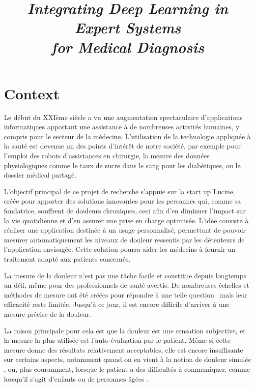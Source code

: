 \documentclass[french]{article}
\date{}
\title{\emph{Integrating Deep Learning in Expert Systems\\ for Medical Diagnosis}}
\begin{document}
\maketitle

\section{Context}
\label{sec:orga8bb14f}

Le début  du XXIème  siècle a vu  une augmentation  spectaculaire d’applications
informatiques apportant  une assistance  à de  nombreuses activités  humaines, y
compris  pour  le  secteur  de  la médecine.  L’utilisation  de  la  technologie
appliquée à la santé  est devenue un des points d’intérêt  de notre société, par
exemple  pour l’emploi  des robots  d’assistances  en chirurgie,  la mesure  des
données physiologiques comme le taux de sucre dans le sang pour les diabétiques,
ou le dossier médical partagé.

L’objectif principal de ce projet de  recherche s’appuie sur la start up Lucine,
créée pour  apporter des solutions innovantes  pour les personnes qui,  comme sa
fondatrice, souffrent de  douleurs chroniques, ceci afin  d’en diminuer l’impact
sur la  vie quotidienne et d’en  assurer une prise en  charge optimisée.  L’idée
consiste à réaliser une application destinée à un usage personnalisé, permettant
de  pouvoir mesurer  automatiquement les  niveaux de  douleur ressentis  par les
détenteurs de l’application envisagée. Cette  solution pourra aider les médecins
à fournir un traitement adapté aux patients concernés.

La mesure de la douleur n’est pas une tâche facile et constitue depuis longtemps
un défi, même pour des professionnels  de santé avertis.  De nombreuses échelles
et   méthodes  de   mesure   ont  été   créées  pour   répondre   à  une   telle
question~\cite{wong1996wong,mccaffery1999pain,portenoy1996visual,melzack1975mcgill,galer1997development,gracely1988descriptor}
mais leur  efficacité reste limitée.  Jusqu’à  ce jour, il est  encore difficile
d’arriver à une mesure précise de la douleur.

La raison principale pour cela est que la douleur est une sensation subjective,
et la mesure la plus utilisée est l’auto-évaluation par le patient. Même si
cette mesure donne des résultats relativement acceptables, elle est encore
insuffisante sur certains aspects, notamment quand on en vient à la notion de
douleur simulée \cite{gwen2007faces}, ou, plus  couramment, lorsque le patient a
des difficultés à communiquer, comme  lorsqu’il s’agit d’enfants ou de personnes
âgées \cite{lucey2011automatically}.
\end{document}
